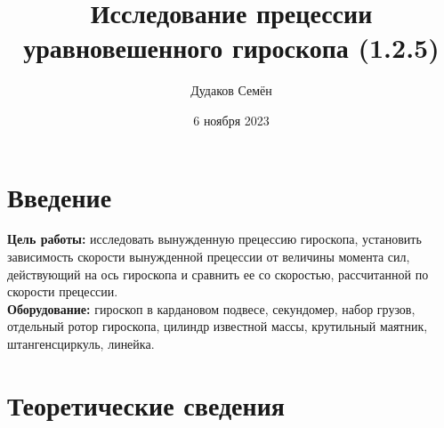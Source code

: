 \documentclass[a4paper, 12pt]{article}
\title{\textbf{Исследование прецессии уравновешенного гироскопа (1.2.5)}}
\author{Дудаков Семён}
\date{6 ноября 2023}
\begin{document}
	\maketitle

	\section{Введение}

	\textbf{Цель работы:} исследовать вынужденную прецессию гироскопа, установить зависимость скорости вынужденной прецессии от величины момента сил, действующий на ось гироскопа и сравнить ее со скоростью, рассчитанной по скорости прецессии.\\
	\textbf{Оборудование:} гироскоп в кардановом подвесе, секундомер, набор грузов, отдельный ротор гироскопа, цилиндр известной массы, крутильный маятник, штангенсциркуль, линейка.

	\section{Теоретические сведения}
\end{document}
